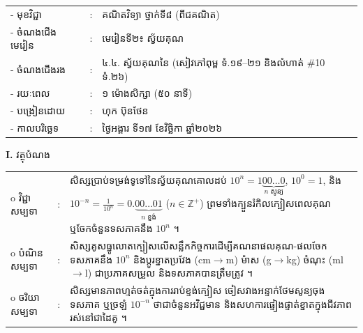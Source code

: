 \documentclass[a4paper,10pt]{article}
\newcommand{\wcirc}{{\CourierBullet\fontsize{9.5pt}{11pt}\selectfont o}}
\newcommand{\en}[1]{{\TimesEn #1}}
\begin{document}
{\renewcommand{\arraystretch}{0.98}
\hspace*{3.1cm}%
\begin{tabular}{@{}l l L{11.0cm}@{}}
  - \hspace{0.35cm} មុខវិជ្ជា & : & គណិតវិទ្យា ថ្នាក់ទី៨ (ពីជគណិត) \\
  - \hspace{0.35cm} ចំណងជើងមេរៀន & : & មេរៀនទី២៖ ស្វ័យគុណ \\
  - \hspace{0.35cm} ចំណងជើងរង & : & ៤.៤. ស្វ័យគុណនៃ \en{10} (សៀវភៅពុម្ព ទំ.១៩–២១ និងលំហាត់ \#10 ទំ.២៦) \\
  - \hspace{0.35cm} រយៈពេល & : & ១ ម៉ោងសិក្សា (៥០ នាទី) \\
  - \hspace{0.35cm} បង្រៀនដោយ & : & ហុក ប៊ុនថែន \\
  - \hspace{0.35cm} កាលបរិច្ឆេទ & : & ថ្ងៃអង្គារ ទី១៧ ខែវិច្ឆិកា ឆ្នាំ២០២៦ \\
\end{tabular}

\vspace{2pt}

\textbf{I.} {\muol វត្ថុបំណង}\\[1pt]
\hspace*{0.55cm}%
\begin{tabular}{@{}l l L{14.2cm}@{}}
  \wcirc \hspace{0.25cm} វិជ្ជាសម្បទា & : & សិស្សប្រាប់ទម្រង់ទូទៅនៃស្វ័យគុណគោលដប់ $10^n = 1\underbrace{00\dots 0}_{n\text{ សូន្យ}}$, $10^0=1$, និង $10^{-n} = \frac{1}{10^n} = 0.\underbrace{00\dots 01}_{n\text{ ខ្ទង់}}$ ($n\in\mathbb{Z}^+$) ព្រមទាំងក្បួនរំកិលក្បៀសពេលគុណ ឬចែកចំនួនទសភាគនឹង $10^n$ ។ \\
  \wcirc \hspace{0.25cm} បំណិនសម្បទា & : & សិស្សគូសធ្នូលោតក្បៀសលើសន្លឹកកិច្ចការដើម្បីគណនាផលគុណ-ផលចែកទសភាគនឹង $10^n$ និងប្ដូរខ្នាតប្រវែង (\en{cm}$\to$\en{m}) ម៉ាស (\en{g}$\to$\en{kg}) ចំណុះ (\en{ml}$\to$\en{l}) ជាប្រភាគសម្រួល និងទសភាគបានត្រឹមត្រូវ ។ \\
  \wcirc \hspace{0.25cm} ចរិយាសម្បទា & : & សិស្សមានភាពហ្មត់ចត់ក្នុងការរាប់ខ្ទង់ក្បៀស ចៀសវាងអន្ទាក់ថែមសូន្យចុងទសភាគ ឬច្រឡំ $10^{-n}$ ថាជាចំនួនអវិជ្ជមាន និងសហការផ្ទៀងផ្ទាត់ខ្នាតក្នុងជីវភាពរស់នៅជាដៃគូ ។ \\
\end{tabular}

}
\end{document}

